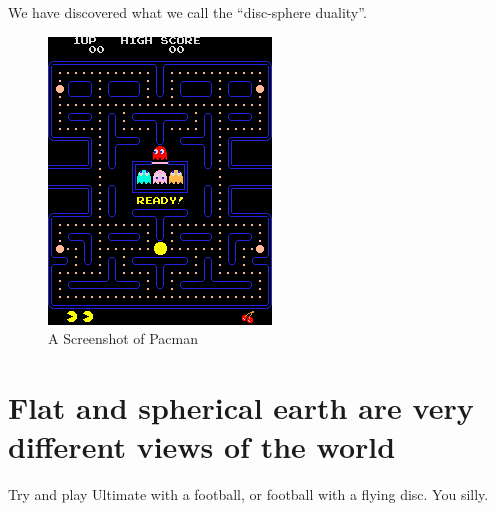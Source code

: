 \documentclass{article}
\begin{document}
We have discovered what we call the ``disc-sphere duality''.

\begin{figure}[ht]
  \centering
  \includegraphics{images/pacman.png}
  \caption{A Screenshot of Pacman}
  \label{fig:pacman-screenshot}
\end{figure}

\section{Flat and spherical earth are very different views of the world}
Try and play Ultimate with a football, or football with a flying disc. You silly.
\end{document}
